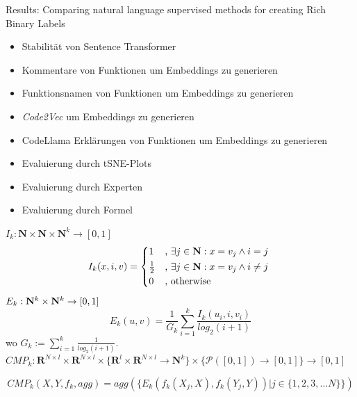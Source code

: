 \documentclass[12pt,letterpaper,ngerman]{article}
\begin{document}
Results: Comparing natural language supervised methods for creating Rich Binary Labels
\begin{itemize}
  \item Stabilität von Sentence Transformer
  \item Kommentare von Funktionen um Embeddings zu generieren
  \item Funktionsnamen von Funktionen um Embeddings zu generieren
  \item \textit{Code2Vec} um Embeddings zu generieren
  \item CodeLlama Erklärungen von Funktionen um Embeddings zu generieren
  \item Evaluierung durch tSNE-Plots
  \item Evaluierung durch Experten
  \item Evaluierung durch Formel
\end{itemize}
$ I_{k}: \mathbf{N} \times \mathbf{N} \times \mathbf{N}^{k} \to [0,1]$
\[ I_{k}(x,i,v) = \begin{cases*} 
1 & , $\exists j \in \mathbf{N}: x = v_j \land i = j$   \\
      \frac{1}{2} & , $\exists j \in \mathbf{N}: x = v_j \land i \neq j$\\
      0   & , \text{otherwise}
                \end{cases*} \]
$E_k: \mathbf{N}^k \times \mathbf{N}^k \to [0,1]$
\[ E_k(u,v) = \frac{1}{G_k} \sum^{k}_{i=1} \frac{I_k(u_i,i,v_i)}{log_2(i+1)}\]
wo $G_k := \sum_{i=1}^{k} \frac{1}{log_2(i+1)}$.\\
$CMP_k: \mathbf{R}^{N\times l} \times \mathbf{R}^{N\times l} \times 
\{ \mathbf{R}^l \times \mathbf{R}^{N\times l} \to \mathbf{N}^k \} 
\times \{ \mathcal{P}([0,1]) \to [0,1] \} \to [0,1]$

\[ CMP_k(X,Y,f_k,agg) = agg(\{E_k(f_k(X_j,X),f_k(Y_j,Y)) | j \in \{1,2,3, \dots N\}\})\]

\pagebreak

\pagestyle{fancy}



\nocite{*} %
\end{document}
